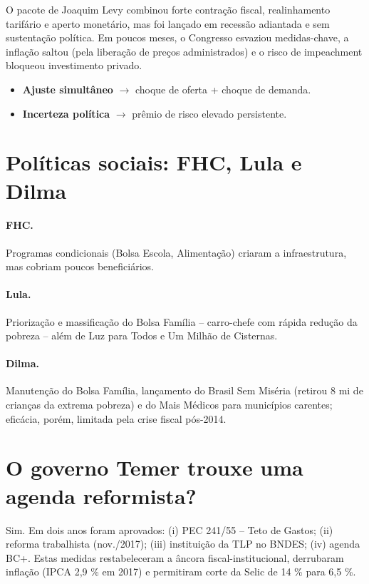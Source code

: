 \documentclass{sciposter}
\begin{document}
\begin{multicols}{3}
O pacote de Joaquim Levy combinou forte contração fiscal, realinhamento tarifário e aperto monetário, mas foi lançado em recessão adiantada e sem sustentação política. Em poucos meses, o Congresso esvaziou medidas-chave, a inflação saltou (pela liberação de preços administrados) e o risco de impeachment bloqueou investimento privado. 

\begin{itemize}
  \item \textbf{Ajuste simultâneo} $\rightarrow$ choque de oferta + choque de demanda.
  \item \textbf{Incerteza política} $\rightarrow$ prêmio de risco elevado persistente.
\end{itemize}

\section{\textbf{Políticas sociais: FHC, Lula e Dilma}}

\paragraph{FHC.} Programas condicionais (Bolsa Escola, Alimentação) criaram a infraestrutura, mas cobriam poucos beneficiários. 

\paragraph{Lula.} Priorização e massificação do Bolsa Família – carro-chefe com rápida redução da pobreza – além de Luz para Todos e Um Milhão de Cisternas.   

\paragraph{Dilma.} Manutenção do Bolsa Família, lançamento do Brasil Sem Miséria (retirou 8 mi de crianças da extrema pobreza) e do Mais Médicos para municípios carentes; eficácia, porém, limitada pela crise fiscal pós-2014. 

\section{\textbf{O governo Temer trouxe uma agenda reformista?}}

Sim. Em dois anos foram aprovados: (i) PEC 241/55 – Teto de Gastos; (ii) reforma trabalhista (nov./2017); (iii) instituição da TLP no BNDES; (iv) agenda BC+. Estas medidas restabeleceram a âncora fiscal-institucional, derrubaram inflação (IPCA 2,9 \% em 2017) e permitiram corte da Selic de 14 \% para 6,5 \%. 


\end{multicols}
\end{document}

